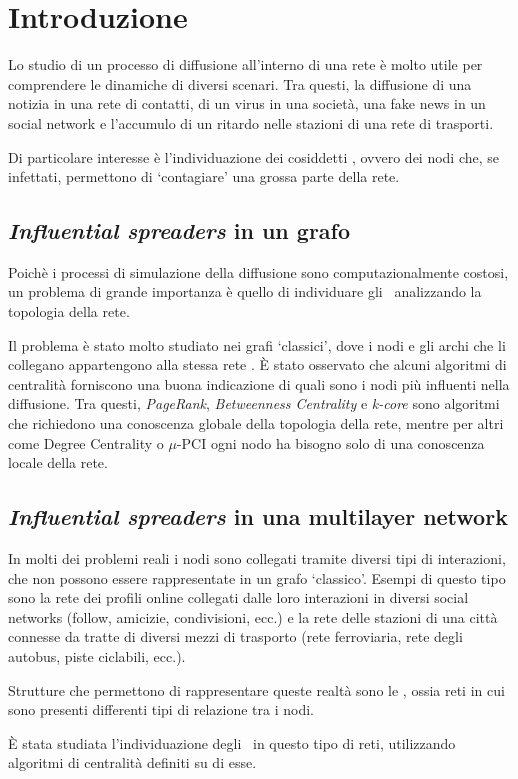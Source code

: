 \chapter{Introduzione}

Lo studio di un processo di diffusione all'interno di una rete è molto utile per comprendere le dinamiche
di diversi scenari. Tra questi, la diffusione di una notizia in una rete di contatti, di un virus in una 
società, una fake news in un social network e l'accumulo di un ritardo nelle stazioni di una rete di trasporti.

Di particolare interesse è l'individuazione dei cosiddetti \infsp, ovvero dei nodi
che, se infettati, permettono di `contagiare' una grossa parte della rete.

\section{\textit{Influential spreaders} in un grafo}

Poichè i processi di simulazione della diffusione sono computazionalmente costosi, un problema
di grande importanza è quello di individuare gli \infsp\ analizzando la topologia della rete.

Il problema è stato molto studiato nei grafi `classici', dove i nodi e gli archi che li collegano 
appartengono alla stessa rete %
\cite{kitsak:infsp}\cite{basaras:infsp}\cite{pei:infsp}.
È stato osservato che alcuni algoritmi di centralità forniscono una buona indicazione di 
quali sono i nodi più influenti nella diffusione. 
Tra questi, \textit{PageRank}, \textit{Betweenness Centrality} e \textit{k-core} sono algoritmi che richiedono una conoscenza
globale della topologia della rete, mentre per altri come Degree Centrality o $\mu$-PCI ogni nodo 
ha bisogno solo di una conoscenza locale della rete.

\section{\textit{Influential spreaders} in una multilayer network}

In molti dei problemi reali i nodi sono collegati tramite diversi tipi di interazioni, che non 
possono essere rappresentate in un grafo `classico'. 
Esempi di questo tipo sono la rete dei profili online collegati dalle loro interazioni
in diversi social networks (follow, amicizie, condivisioni, ecc.) e la rete delle stazioni di 
una città connesse da tratte di diversi mezzi di trasporto (rete ferroviaria, rete degli autobus, 
piste ciclabili, ecc.).

Strutture che permettono di rappresentare queste realtà sono le \muln, ossia reti in cui sono 
presenti differenti tipi di relazione tra i nodi. 

È stata studiata l'individuazione degli \infsp\ in questo tipo di reti, utilizzando 
algoritmi di centralità definiti su di esse.

